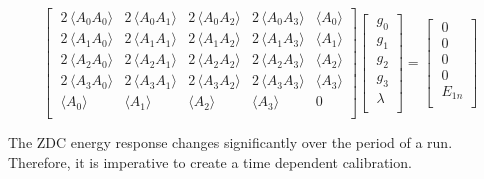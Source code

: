 \begin{equation}
    \label{LagrangeMatrix}
    \begin{bmatrix}
        \; 2 \,\langle A_0 A_0 \rangle & 2 \,\langle A_0 A_1 \rangle & 2 \,\langle A_0 A_2 \rangle & 2 \,\langle A_0 A_3 \rangle & \langle A_0 \rangle \\
        \; 2 \,\langle A_1 A_0 \rangle & 2 \,\langle A_1 A_1 \rangle & 2 \,\langle A_1 A_2 \rangle & 2 \,\langle A_1 A_3 \rangle & \langle A_1 \rangle \\
        \; 2 \,\langle A_2 A_0 \rangle & 2 \,\langle A_2 A_1 \rangle & 2 \,\langle A_2 A_2 \rangle & 2 \,\langle A_2 A_3 \rangle & \langle A_2 \rangle \\
        \; 2 \,\langle A_3 A_0 \rangle & 2 \,\langle A_3 A_1 \rangle & 2 \,\langle A_3 A_2 \rangle & 2 \,\langle A_3 A_3 \rangle & \langle A_3 \rangle \\
        \;  \langle A_0 \rangle & \langle A_1 \rangle & \langle A_2 \rangle & \langle A_3 \rangle & 0 \\
    \end{bmatrix}
    \begin{bmatrix}
        \; g_0 \\
        \; g_1 \\
        \; g_2 \\
        \; g_3 \\
        \; \lambda \\
    \end{bmatrix}
    =
    \begin{bmatrix}
        \; 0 \\
        \; 0 \\
        \; 0 \\
        \; 0 \\
        \; E_{1n} \\
    \end{bmatrix}
\end{equation}

The ZDC energy response changes significantly over the period of a run.  Therefore, it is imperative to create a time dependent calibration.

